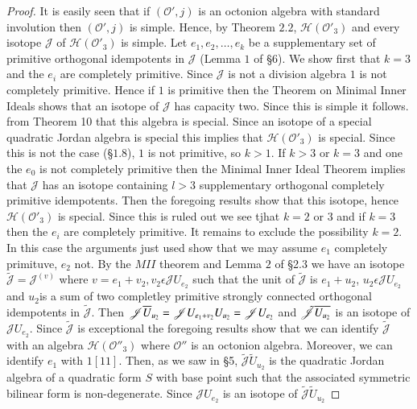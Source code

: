 \begin{proof}
It is easily seen that if $(\mathcal{O}',j)$ is an octonion algebra
with standard involution then $(\mathcal{O}',j)$ is simple. Hence, by
Theorem $2.2$, $\mathscr{H}(\mathcal{O}'_3)$ and every isotope
$\mathscr{J}$ of $\mathscr{H}(\mathcal{O}'_3)$ is simple. Let
$e_1,e_2,\ldots,e_k$ be a supplementary set of primitive orthogonal
idempotents in $\mathscr{J}$ (Lemma $1$ of \S 6). We show first that
$k=3$ and the $e_i$ are completely primitive. Since $\mathscr{J}$ is
not a division algebra $1$ is not completely primitive. Hence if $1$
is primitive then the Theorem on Minimal Inner Ideals shows that an
isotope of $\mathscr{J}$ has capacity two. Since this is simple it
follows. from Theorem 10 that this algebra is special. Since an
isotope of a special quadratic Jordan algebra is special this implies
that $\mathscr{H}(\mathcal{O}'_3)$ is special. Since this is not the
case (\S $1.8$), $1$ is not primitive, so $k>1$. If $k>3$ or $k=3$ and
one the $e_0$ is not completely primitive then the Minimal Inner Ideal
Theorem implies that $\mathscr{J}$ has an isotope containing $l>3$
supplementary orthogonal completely primitive idempotents. Then the
foregoing results show that this isotope, hence
$\mathscr{H}(\mathcal{O}'_3)$ is special. Since this is ruled out we
see tjhat $k=2$ or $3$ and if $k=3$ then the $e_i$ are completely
primitive. It remains to exclude the possibility $k=2$. In this case
the arguments just used show that we may assume $e_1$ completely
primituve, $e_2$ not. By the $MII$ theorem and Lemma $2$ of \S 2.3 we
have an isotope $\tilde{\mathscr{J}}=\mathscr{J}^{(v)}$ where
$v=e_1+v_2,v_2\epsilon \mathscr{J}U_{e_2}$ such that the unit of
$\tilde{\mathscr{J}}$ is $e_1+u_2$, $u_2\epsilon \mathscr{J} U_{e_2}$ and
$u_2$\pageoriginale is a sum of two completley primitive strongly
connected orthogonal idempotents in $\tilde{\mathscr{J}}$. Then
$\mathscr{J}\overline{U}_{u_2}=\mathscr{J} U_{e_{1}+v_2}U_{u_2}=\mathscr{J}
U_{e_2}$ and $\tilde{\mathscr{J}} \overline{U_{u_2}}$ is an isotope of
$\mathscr{J} U_{e_2}$. Since $\tilde{\mathscr{J}}$ is exceptional the
foregoing results show that we can identify $\tilde{\mathscr{J}}$ with an
algebra $\mathscr{H}(\mathcal{O}''_3)$ where $\mathcal{O}''$ is an
octonion algebra. Moreover, we can identify $e_1$ with $1[11]$. Then,
as we saw in \S 5, $\tilde{\mathscr{J}}\tilde{U}_{u_2}$ is the quadratic
Jordan algebra of a quadratic form $S$ with base point such that the
associated symmetric bilinear form is non-degenerate. Since
$\mathscr{J}U_{e_2}$ is an isotope of $\tilde{\mathscr{J}} \tilde{U}_{u_2}$

\end{proof}
